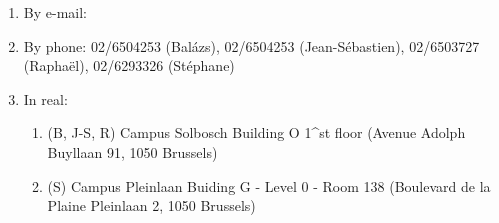 \begin{enumerate}
\item  By e-mail:  \hpcinfo
\item  By phone: 02/6504253 (Bal\'azs), 02/6504253 (Jean-S\'ebastien), 02/6503727 (Rapha\"el), 02/6293326 (St\'ephane)
\item  In real:
\begin{enumerate}
\item  (B, J-S, R) Campus Solbosch Building O 1^{st} floor (Avenue Adolph Buyllaan 91, 1050 Brussels)
\item  (S) Campus Pleinlaan Buiding G - Level 0 - Room 138 (Boulevard de la Plaine Pleinlaan 2, 1050 Brussels)
\end{enumerate}
\end{enumerate}
